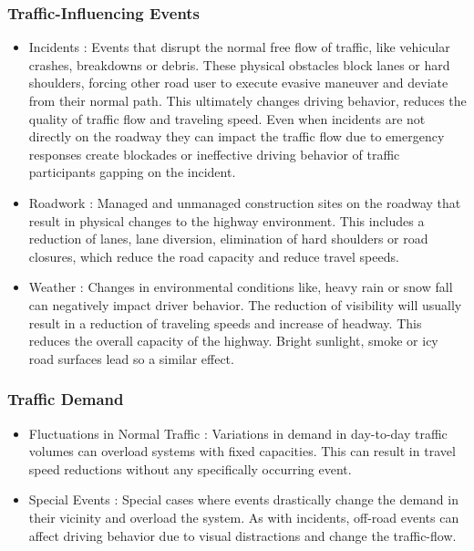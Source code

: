 \documentclass[a4paper,headsepline,footsepline,fontsize=11pt,BCOR=12mm,DIV=12]{report}
\begin{document}
\subsubsection{Traffic-Influencing Events}

\begin{itemize}
	\item Incidents : Events that disrupt the normal free flow of traffic, like vehicular crashes, breakdowns or debris. These physical obstacles block lanes or hard shoulders, forcing other road user to execute evasive maneuver and deviate from their normal path. This ultimately changes driving behavior, reduces the quality of traffic flow and traveling speed. Even when incidents are not directly on the roadway they can impact the traffic flow due to emergency responses create blockades or ineffective driving behavior of traffic participants gapping on the incident.
	\item Roadwork : Managed and unmanaged construction sites on the roadway that result in physical changes to the highway environment. This includes a reduction of lanes, lane diversion, elimination of hard shoulders or road closures, which reduce the road capacity and reduce travel speeds.
	\item Weather : Changes in environmental conditions like, heavy rain or snow fall can negatively impact driver behavior. The reduction of visibility will usually result in a reduction of traveling speeds and increase of headway. This reduces the overall capacity of the highway. Bright sunlight, smoke or icy road surfaces lead so a similar effect.
\end{itemize}

\subsubsection{Traffic Demand}

\begin{itemize}
	\item Fluctuations in Normal Traffic : Variations in demand in day-to-day traffic volumes can overload systems with fixed capacities. This can result in travel speed reductions without any specifically occurring event.
	\item Special Events : Special cases where events drastically change the demand in their vicinity and overload the system. As with incidents, off-road events can affect driving behavior due to visual distractions and change the traffic-flow. 
\end{itemize}
\end{document}
